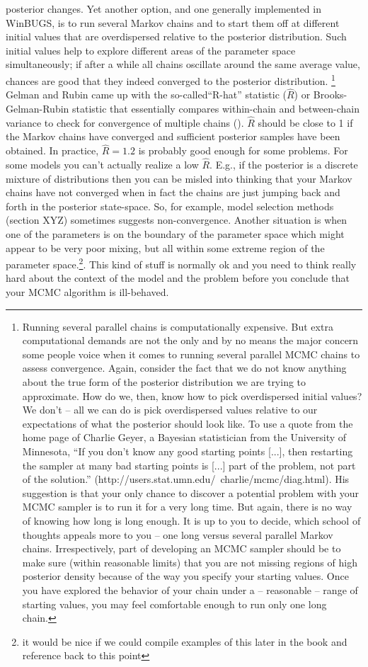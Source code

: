 posterior changes. Yet another option, and one generally implemented in WinBUGS, is to run several Markov chains and to start them off at different initial values that are overdispersed relative to the posterior distribution. Such initial values help to explore different areas of the parameter space simultaneously; if after a while all chains oscillate around the same average value, chances are good that they indeed converged to the posterior distribution. \footnote{Running several parallel chains is computationally expensive. But extra computational demands are not the only and by no means the major concern some people voice when it comes to running several parallel MCMC chains to assess convergence. Again, consider the fact that we do not know anything about the true form of the posterior distribution we are trying to approximate. How do we, then, know how to pick overdispersed initial values? We don’t – all we can do is pick overdispersed values relative to our expectations of what the posterior should look like. To use a quote from the home page of Charlie Geyer, a Bayesian statistician from the University of Minnesota, ``If you don't know any good starting points [...], then restarting the sampler at many bad starting points is [...] part of the problem, not part of the solution.'' (http://users.stat.umn.edu/~charlie/mcmc/diag.html). His suggestion is that your only chance to discover a potential problem with your MCMC sampler is to run it for a very long time. But again, there is no way of knowing how long is long enough.
It is up to you to decide, which school of thoughts appeals more to you – one long versus several parallel Markov chains. Irrespectively, part of developing an MCMC sampler should be to make sure (within reasonable limits) that you are not missing regions of high posterior density because of the way you specify your starting values. Once you have explored the behavior of your chain under a – reasonable – range of starting values, you may feel comfortable enough to run only one long chain.} Gelman and Rubin came up with the so-called``R-hat'' statistic ($\hat{R}$) or Brooks-Gelman-Rubin statistic
 that essentially compares within-chain and between-chain variance to check for convergence of multiple chains (\citep{gelman_etal:1996}). $\hat{R}$ should be close to 1 if the Markov
chains have converged and sufficient posterior samples have been
obtained. In practice, $\hat{R} = 1.2$ is probably good enough for
some problems.  For some models you can't actually realize a low
$\hat{R}$. E.g., if the posterior is a discrete mixture of distributions
then you can be misled into thinking that your Markov chains
have not converged when in fact the chains are just jumping back and
forth in the posterior state-space. 
So, for example, model
selection methods (section XYZ) sometimes suggests non-convergence.
Another situation is when one of the parameters is on the boundary of
the parameter space which might appear to be very poor mixing, but all
within some extreme region of the parameter space.\footnote{it would
  be nice if we could compile examples of this later in the book and
  reference back to this point}.
This
kind of stuff is normally ok and you need to think really hard about
the context of the model and the problem before you conclude that your
MCMC algorithm is ill-behaved.

